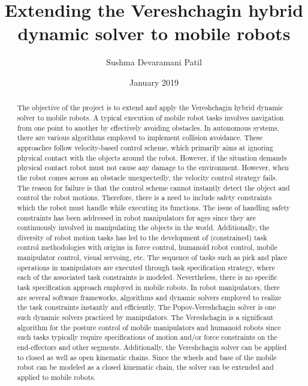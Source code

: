 \documentclass[rnd]{mas_report}
\author{Sushma Devaramani Patil}
\title{Extending the Vereshchagin hybrid dynamic solver to mobile robots}
\date{January  2019}
\begin{document}
	\begin{titlepage}
		\maketitle
	\end{titlepage}
	
	
	\pagestyle{plain}
	
	
	\cleardoublepage
	\statementpage
	
	\begin{abstract}
		The objective of the project is to extend and apply the Vereshchagin hybrid dynamic solver to mobile robots. A typical execution of mobile robot tasks involves navigation from one point to another by effectively avoiding obstacles. In autonomous systems, there are various algorithms employed to implement collision avoidance. These approaches follow velocity-based control scheme, which primarily aims at ignoring physical contact with the objects around the robot. However, if the situation demands physical contact robot must not cause any damage to the environment. However, when the robot comes across an obstacle unexpectedly, the velocity control strategy fails. The reason for failure is that the control scheme cannot instantly detect the object and control the robot motions. Therefore, there is a need to include safety constraints which the robot must handle while executing its functions. The issue of handling safety constraints has been addressed in robot manipulators for ages since they are continuously involved in manipulating the objects in the world. Additionally, the diversity of robot motion tasks has led to the development of (constrained) task control methodologies with origins in force control, humanoid robot control, mobile manipulator control, visual servoing, etc. The sequence of tasks such as pick and place operations in manipulators are executed through task specification strategy, where each of the associated task constraints is modeled. Nevertheless, there is no specific task specification approach employed in mobile robots. In robot manipulators, there are several software frameworks, algorithms and dynamic solvers employed to realize the task constraints instantly and efficiently. The Popov-Vereshchagin solver is one such dynamic solvers practiced by manipulators. The Vereshchagin is a significant algorithm for the posture control of mobile manipulators and humanoid robots since such tasks typically require specifications of motion and/or force constraints on the end-effectors and other segments. Additionally, the Vereshchagin solver can be applied to closed as well as open kinematic chains. Since the wheels and base of the mobile robot can be modeled as a closed kinematic chain, the solver can be extended and applied to mobile robots.
	\end{abstract}
	
\end{document}
